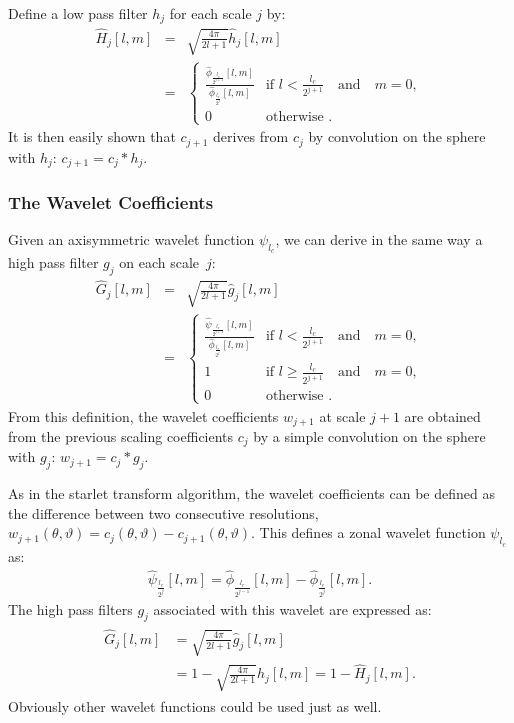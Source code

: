 Define a low pass filter $h_{j}$ for each scale $j$  by:
\begin{eqnarray}
 \widehat{H}_{j}[l,m]  & = & \sqrt{\frac{4\pi}{2l+1} }  \hat h_{j}[l,m]   \nonumber  \\
   &  = & 
   \begin{cases}
   \frac {   \hat \phi_{\frac{l_{c}}{2^{j+1}} }[l,m]   }   {  \hat  \phi_{  \frac{l_{c}}{2^{j}} }[l,m]   } & \mbox{if }  l  < \frac{ l_{c}} {2^{j+1}} \quad \textrm{and}\quad m = 0 , \\
   0 & \mbox{otherwise } . 
  \end{cases}
\end{eqnarray}
It is then easily shown that $c_{j+1}$ derives from $c_j$ by convolution on the sphere with $h_j$:  $c_{j+1} = c_{j} \ast h_j$.


\subsubsection{The Wavelet Coefficients}

Given an axisymmetric  wavelet function $\psi_{l_c}$, we can derive in the same way a 
high pass filter $g_j$ on each scale~$j$:
\begin{eqnarray}
 \widehat{G}_{j}[l,m]  & = & \sqrt{\frac{4\pi}{2l+1} }  \hat{g}_{j}[l,m] \nonumber  \\
   & = & 
  \begin{cases}
  \frac {   \hat \psi_{\frac{l_{c}}{2^{j+1}} }[l,m]   }   {  \hat  \phi_{  \frac{l_{c}}{2^{j}} }[l,m]   } & \mbox{if }  l  < \frac{ l_{c}} {2^{j+1}} \quad \textrm{and}\quad m = 0 ,\\
1 &\mbox{if }  l  \ge \frac{ l_{c}} {2^{j+1}} \quad \textrm{and}\quad m = 0 ,\\ 
0&  \mbox{otherwise } .
  \end{cases}
\end{eqnarray}
From this definition, the wavelet coefficients $w_{j+1} $ at scale $j+1$ are obtained from the previous scaling coefficients $c_j$ by a simple convolution on the sphere with $g_j$: $w_{j+1} = c_{j} \ast g_j$.

As in the  starlet transform   algorithm, the wavelet coefficients can be defined as the difference between two consecutive resolutions, $w_{j+1}(\theta, \vartheta) = c_{j}(\theta, \vartheta) - c_{j+1}(\theta, \vartheta)$. This defines a zonal wavelet function $\psi_{l_c}$ as:
\begin{eqnarray}\label{wavelet}
\hat \psi_{\frac{l_c}{2^{j}}}[l,m] = \hat \phi_{\frac{l_c}{2^{j-1}}} [l,m]  - \hat \phi_{\frac{l_c}{2^{j}}}[l,m] .
\end{eqnarray}
The high pass filters $g_j$ associated with this wavelet are expressed as: 
\begin{eqnarray}
\begin{split}
\widehat{G}_{j}[l,m]  & = \sqrt{\frac{4\pi}{2l+1} } \hat{g}_{j}[l,m]  \\
                  & = 1 - \sqrt{\frac{4\pi}{2l+1} } \hat{h}_j[l,m]   =   1 - \widehat{H}_j[l,m] .
\end{split}
\end{eqnarray}
Obviously other wavelet functions could be used just as well.



